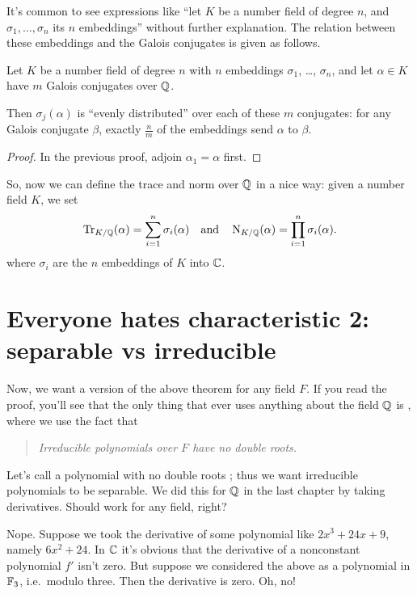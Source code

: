 It's common to see expressions like ``let $K$ be a number field of degree $n$,
and $\sigma_1, \dots, \sigma_n$ its $n$ embeddings'' without further explanation.
The relation between these embeddings and the Galois conjugates is given as follows.
\begin{theorem}
	\label{thm:conj_distrb}
	Let $K$ be a number field of degree $n$
	with $n$ embeddings $\sigma_1$, \dots, $\sigma_n$,
	and let $\alpha \in K$ have $m$ Galois conjugates over $\mathbb Q$. 

	Then $\sigma_j(\alpha)$ is ``evenly distributed''
	over each of these $m$ conjugates: for any Galois conjugate $\beta$,
	exactly $\frac nm$ of the embeddings send $\alpha$ to $\beta$.
\end{theorem}
\begin{proof}
	In the previous proof, adjoin $\alpha_1 = \alpha$ first.
\end{proof}

So, now we can define the trace and norm over $\mathbb Q$ in a nice way:
given a number field $K$, we set
\[
	\operatorname{Tr}_{K/\mathbb Q}(\alpha) = \sum_{i=1}^n \sigma_i(\alpha)
	\quad\text{and}\quad
	\operatorname{N}_{K/\mathbb Q}(\alpha) = \prod_{i=1}^n \sigma_i(\alpha).
\]
where $\sigma_i$ are the $n$ embeddings of $K$ into $\mathbb C$.

\section{Everyone hates characteristic 2: separable vs irreducible}
Now, we want a version of the above theorem for any field $F$.
If you read the proof, you'll see that the only thing that ever uses anything about the field $\mathbb Q$
is , where we use the fact that
\begin{quote}
	\itshape Irreducible polynomials over $F$ have no double roots.
\end{quote}

Let's call a polynomial with no double roots ;
thus we want irreducible polynomials to be separable.
We did this for $\mathbb Q$ in the last chapter by taking derivatives.
Should work for any field, right?

Nope.
Suppose we took the derivative of some polynomial like $2x^3 + 24x + 9$,
namely $6x^2 + 24$.
In $\mathbb C$ it's obvious that the derivative of a nonconstant polynomial $f'$ isn't zero.
But suppose we considered the above as a polynomial in $\mathbb F_3$, i.e.\ modulo three.
Then the derivative is zero.
Oh, no!

